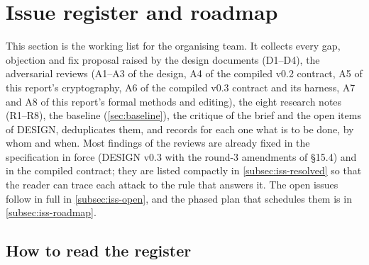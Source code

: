 \section{Issue register and roadmap}\label{sec:issues}

This section is the working list for the organising team. It collects every gap, objection and
fix proposal raised by the design documents (D1--D4), the adversarial reviews (A1--A3 of the design,
A4 of the compiled v0.2 contract, A5 of this report's cryptography, A6 of the compiled v0.3 contract
and its harness, A7 and A8 of this report's formal methods and editing), the eight research notes (R1--R8), the baseline (\cref{sec:baseline}), the critique
of the brief and the open items of DESIGN, deduplicates them, and records for each one what is to be
done, by whom and when. Most findings of the reviews are already fixed in the specification in force
(DESIGN v0.3 with the round-3 amendments of §15.4) and in the compiled contract; they are listed
compactly in \cref{subsec:iss-resolved} so that the reader can trace each attack to the rule that
answers it. The open issues follow in full in \cref{subsec:iss-open}, and the phased plan that
schedules them is in \cref{subsec:iss-roadmap}.

\newcommand{\IRprio}[1]{\textbf{\textcolor{red!55!black}{#1}}}
\newcommand{\IRprob}{\par\noindent\textbf{Problem.}~}
\newcommand{\IRwhy}{\par\smallskip\noindent\textbf{Why it matters.}~}
\newcommand{\IRres}{\par\smallskip\noindent\textbf{Proposed resolution.}~}
\newcommand{\IRmeta}[4]{\par\smallskip\noindent\textbf{Owner:}~#1\enspace\textbar\enspace
  \textbf{Priority:}~\IRprio{#2}\enspace\textbar\enspace\textbf{Phase:}~#3\enspace\textbar\enspace
  \textbf{Status:}~#4}
\newcommand{\IRsrc}[1]{\par\noindent\textbf{Sources:}~#1}
\newcommand{\libc}[1]{\textsf{lib-L#1}}

\subsection{How to read the register}\label{subsec:iss-read}

